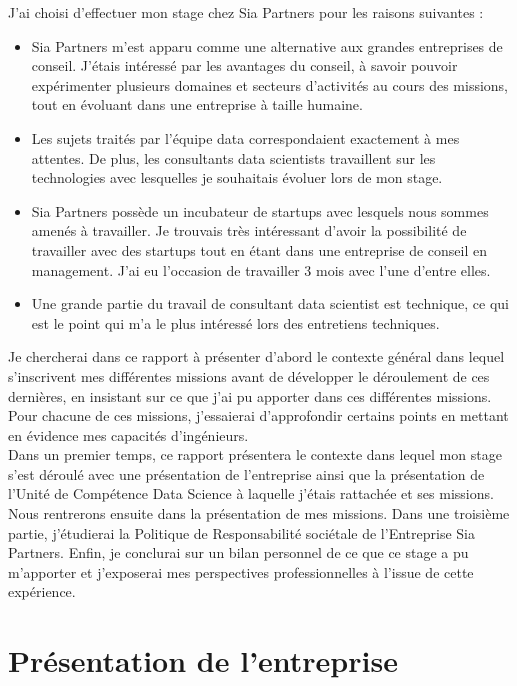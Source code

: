 \documentclass{article} %
\begin{document}
\noindent J’ai choisi d’effectuer mon stage chez Sia Partners pour les raisons suivantes :
\begin{itemize}
 \item Sia Partners m’est apparu comme une alternative aux grandes entreprises de conseil. J’étais intéressé par les avantages du conseil, à savoir pouvoir expérimenter plusieurs domaines et secteurs d’activités au cours des missions, tout en évoluant dans une entreprise à taille humaine.
 \item Les sujets traités par l’équipe data correspondaient exactement à mes
 attentes. De plus, les consultants data scientists travaillent sur les technologies
 avec lesquelles je souhaitais évoluer lors de mon stage. 
 \item Sia Partners possède un incubateur de startups avec lesquels nous
 sommes amenés à travailler. Je trouvais très intéressant d’avoir la possibilité
 de travailler avec des startups tout en étant dans une entreprise de conseil en
 management. J'ai eu l'occasion de travailler 3 mois avec l'une d'entre elles. 
 \item Une grande partie du travail de consultant data scientist est technique, ce qui est le point qui m'a le plus intéressé lors des entretiens techniques.
\end{itemize}

Je chercherai dans ce rapport à présenter d'abord le contexte général dans lequel s'inscrivent mes différentes missions avant de développer le déroulement de ces dernières, en insistant sur ce que j’ai pu apporter dans ces différentes missions. Pour chacune de ces missions, j’essaierai d'approfondir certains points en mettant en évidence mes capacités d'ingénieurs.\\

Dans un premier temps, ce rapport présentera le contexte dans lequel mon stage s’est déroulé avec une présentation de l’entreprise ainsi que la présentation de l’Unité de Compétence Data Science à laquelle j’étais rattachée et ses missions. Nous rentrerons ensuite dans la présentation de mes missions. Dans une troisième partie, j’étudierai la Politique de Responsabilité sociétale de l’Entreprise Sia Partners. Enfin, je conclurai sur un bilan personnel de ce que ce stage a pu m’apporter et j’exposerai mes perspectives professionnelles à l’issue de cette expérience.


\newpage

\section{Présentation de l'entreprise}
\end{document}
